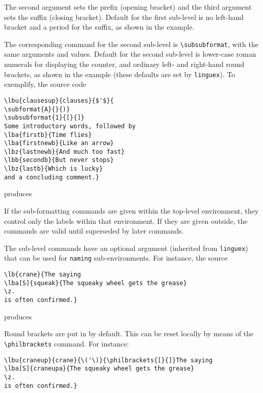 \documentclass[11pt]{article}
\begin{document}
The second argument sets the prefix (opening bracket) and the third argument sets the suffix (closing bracket). Default for the first sub-level is no left-hand bracket and a period for the suffix, as shown in the example.

The corresponding command for the second sub-level is \verb+\subsubformat+, with the same arguments and values. Default for the second sub-level is lower-case roman numerals for displaying the counter, and ordinary left- and right-hand round brackets, as shown in the example (these defaults are set by \verb+linguex+).  To exemplify, the source code

\begin{verbatim}
\lbu{clausesup}{clauses}{$'$}{
\subformat{A}{}{)}
\subsubformat{1}{[}{]}
Some introductory words, followed by 
\lba{firstb}{Time flies}	
\lba{firstnewb}{Like an arrow} 
\lbz{lastnewb}{And much too fast}
\lbb{secondb}{But never stops}
\lbz{lastb}{Which is lucky}
and a concluding comment.}
\end{verbatim}

produces


If the sub-formatting commands are  given within the top-level environment, they control only the labels within that environment. If they are given outside, the commands are valid until superseded by later commands. 

The sub-level commands  have an optional argument (inherited from \verb+linguex+) that can be used for \verb+naming+ sub-environments. For instance, the source

\begin{verbatim}
\lb{crane}{The saying
\lba[S]{squeak}{The squeaky wheel gets the grease}
\z.
is often confirmed.}
\end{verbatim}
	produces 


	Round brackets are put in by default. This can be reset locally by means of the \verb+\philbrackets+ command. For instance:
	
\begin{verbatim}
\lbu{craneup}{crane}{\('\)}{\philbrackets{[}{]}The saying
\lba[S]{craneupa}{The squeaky wheel gets the grease}
\z.
is often confirmed.}
\end{verbatim} 
	
\end{document}
